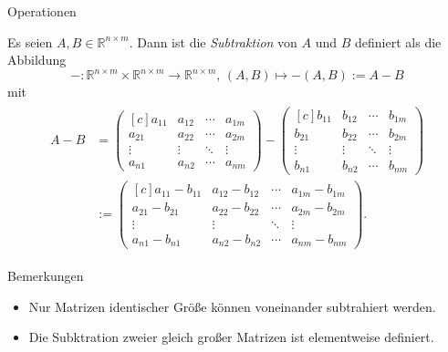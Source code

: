 \documentclass[
  8pt,
  ignorenonframetext,
]{beamer}
\providecommand{\tightlist}{%
  \setlength{\itemsep}{0pt}\setlength{\parskip}{0pt}}
\begin{document}
\begin{frame}{Operationen}
\protect\hypertarget{operationen-2}{}
\footnotesize
\begin{definition}[Matrixsubtraktion]
Es seien $A,B\in \mathbb{R}^{n\times m}$. Dann ist  die \textit{Subtraktion} von $A$
und $B$ definiert als die Abbildung
\begin{equation}
- : \mathbb{R}^{n\times m} \times \mathbb{R}^{n\times m} \to \mathbb{R}^{n\times m}, \,
(A,B) \mapsto -(A,B) := A - B
\end{equation}
mit
\begin{align}
\begin{split}
A - B
& =
\begin{pmatrix*}[c]
a_{11} & a_{12} & \cdots & a_{1m} \\
a_{21} & a_{22} & \cdots & a_{2m} \\
\vdots & \vdots & \ddots & \vdots \\
a_{n1} & a_{n2} & \cdots & a_{nm}
\end{pmatrix*}
-
\begin{pmatrix*}[c]
b_{11} & b_{12} & \cdots & b_{1m} \\
b_{21} & b_{22} & \cdots & b_{2m} \\
\vdots & \vdots & \ddots & \vdots \\
b_{n1} & b_{n2} & \cdots & b_{nm}
\end{pmatrix*}
\\
&
:=
\begin{pmatrix*}[c]
a_{11} - b_{11} & a_{12} - b_{12} & \cdots & a_{1m} - b_{1m} \\
a_{21} - b_{21} & a_{22} - b_{22} & \cdots & a_{2m} - b_{2m} \\
\vdots & \vdots & \ddots & \vdots \\
a_{n1} - b_{n1} & a_{n2} - b_{n2} & \cdots & a_{nm} - b_{nm}
\end{pmatrix*}.
\end{split}
\end{align}
\end{definition}

Bemerkungen

\begin{itemize}
\tightlist
\item
  Nur Matrizen identischer Größe können voneinander subtrahiert werden.
\item
  Die Subktration zweier gleich großer Matrizen ist elementweise
  definiert.
\end{itemize}
\end{frame}
\end{document}
